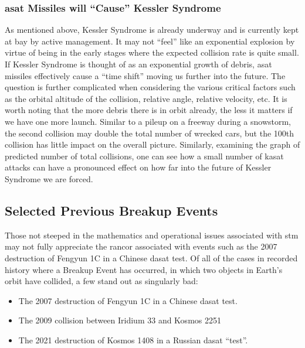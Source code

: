 \subsubsection{\ac{asat} Missiles will ``Cause'' Kessler Syndrome}
As mentioned above, Kessler Syndrome is already underway and is
currently kept at bay by active management.  It may not ``feel'' like
an exponential explosion by virtue of being in the early stages where
the expected collision rate is quite small.\cite[p2]{kessler-reunion}
If Kessler Syndrome is thought of as an exponential growth of debris,
\ac{asat} missiles effectively cause a ``time shift'' moving us
further into the future.\cite[p10]{kessler-reunion} The question is
further complicated when considering the various critical factors such
as the orbital altitude of the collision, relative angle, relative
velocity, etc.  It is worth noting that the more debris there is in
orbit already, the less it matters if we have one more launch.
Similar to a pileup on a freeway during a snowstorm, the second
collision may double the total number of wrecked cars, but the 100th
collision has little impact on the overall picture.  Similarly,
examining the graph of predicted number of total
collisions\cite[p6]{kessler-reunion}, one can see how a small number
of \ac{kasat} attacks can have a pronounced effect on how far into the
future of Kessler Syndrome we are forced.

\subsection{Selected Previous Breakup Events}

Those not steeped in the mathematics and operational issues associated
with \ac{stm} may not fully appreciate the rancor associated with
events such as the 2007 destruction of Fengyun 1C in a Chinese
\ac{dasat} test.  Of all of the cases in recorded history where a
Breakup Event has occurred, in which two objects in Earth's orbit have
collided, a few stand out as singularly bad:

\begin{itemize}

\item The 2007 destruction of Fengyun 1C in a Chinese \ac{dasat} test.

\item The 2009 collision between Iridium 33 and Kosmos 2251

\item The 2021 destruction of Kosmos 1408 in a Russian \ac{dasat} ``test''.

\end{itemize}

